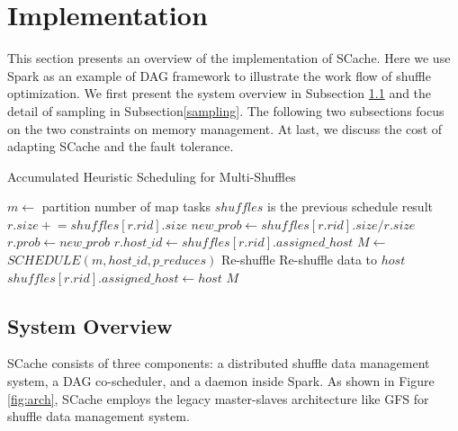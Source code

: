 \section{Implementation}\label{impl}
This section presents an overview of the implementation of SCache. 
Here we use Spark as an example of DAG framework to illustrate the work flow of shuffle optimization. 
We first present the system overview in Subsection \ref{arch} and the detail of sampling in Subsection\ref{sampling}. 
The following two subsections focus on the two constraints on memory management.
At last, we discuss the cost of adapting SCache and the fault tolerance. 

\begin{minipage}{\columnwidth}
\begin{algorithm}[H]
\caption{Accumulated Heuristic Scheduling for Multi-Shuffles}
\label{mhminheap}
	\begin{algorithmic}[1]
	\small
		\State $m\gets$ partition number of map tasks
		\Comment $shuffles$ is the previous schedule result 
			\State $r.size \mathrel{+}= shuffles\left[r.rid\right].size$
			\State $new\_prob\gets shuffles\left[r.rid\right].size / r.size$
				\State $r.prob\gets new\_prob$
				\State $r.host\_id\gets shuffles\left[r.rid\right].assigned\_host$
			\EndIf
		\EndFor
		\State $M\gets$ $SCHEDULE\left(m, host\_id, p\_reduces\right)$
			\Comment Re-shuffle
				\State Re-shuffle data to $host$
				\State $shuffles\left[r.rid\right].assigned\_host\gets host$
				\EndIf
			\EndFor
		\EndFor
		\Return $M$
	\EndProcedure
	\end{algorithmic}
\end{algorithm}
\end{minipage}

\subsection{System Overview}\label{arch}
SCache consists of three components: a distributed shuffle data management system, a DAG co-scheduler, and a daemon inside Spark. As shown in Figure \ref{fig:arch}, SCache employs the legacy master-slaves architecture like GFS \cite{gfs} for shuffle data management system. 

